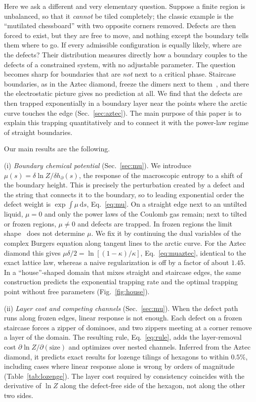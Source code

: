 \documentclass[aps,pre,twocolumn,superscriptaddress,nofootinbib,floatfix]{revtex4-2}
\newcommand{\dd}{\mathrm{d}}
\begin{document}
Here we ask a different and very elementary question. Suppose a finite region is unbalanced, so that it \emph{cannot} be tiled completely; the classic example is the ``mutilated chessboard'' with two opposite corners removed. Defects are then forced to exist, but they are free to move, and nothing except the boundary tells them where to go. If every admissible configuration is equally likely, where are the defects? Their distribution measures directly how a boundary couples to the defects of a constrained system, with no adjustable parameter. The question becomes sharp for boundaries that are \emph{not} next to a critical phase. Staircase boundaries, as in the Aztec diamond, freeze the dimers next to them~\cite{JockuschProppShor1998}, and there the electrostatic picture gives no prediction at all. We find that the defects are then trapped exponentially in a boundary layer near the points where the arctic curve touches the edge (Sec.~\ref{sec:aztec}). The main purpose of this paper is to explain this trapping quantitatively and to connect it with the power-law regime of straight boundaries.

Our main results are the following.

(i) \emph{Boundary chemical potential} (Sec.~\ref{sec:mu}). We introduce $\mu(s)=\delta\ln Z/\delta h_\partial(s)$, the response of the macroscopic entropy to a shift of the boundary height. This is precisely the perturbation created by a defect and the string that connects it to the boundary, so to leading exponential order the defect weight is $\exp\int\mu\,\dd s$, Eq.~\eqref{eq:mu}. On a straight edge next to an untilted liquid, $\mu=0$ and only the power laws of the Coulomb gas remain; next to tilted or frozen regions, $\mu\neq0$ and defects are trapped. In frozen regions the limit shape~\cite{CohnKenyonPropp2001,KenyonOkounkov2007} does not determine $\mu$. We fix it by continuing the dual variables of the complex Burgers equation along tangent lines to the arctic curve. For the Aztec diamond this gives $\mu\delta/2=\ln[(1-\kappa)/\kappa]$, Eq.~\eqref{eq:muaztec}, identical to the exact lattice law, whereas a naive regularization is off by a factor of about $1.45$. In a ``house''-shaped domain that mixes straight and staircase edges, the same construction predicts the exponential trapping rate and the optimal trapping point without free parameters (Fig.~\ref{fig:house}).

(ii) \emph{Layer cost and competing channels} (Sec.~\ref{sec:mu}). When the defect path runs along frozen edges, linear response is not enough. Each defect on a frozen staircase forces a zipper of dominoes, and two zippers meeting at a corner remove a layer of the domain. The resulting rule, Eq.~\eqref{eq:rule}, adds the layer-removal cost $\partial\ln Z/\partial(\text{size})$ and optimizes over nested channels. Inferred from the Aztec diamond, it predicts exact results for lozenge tilings of hexagons to within $0.5\%$, including cases where linear response alone is wrong by orders of magnitude (Table~\ref{tab:lozenge}). The layer cost required by consistency coincides with the derivative of $\ln Z$ along the defect-free side of the hexagon, not along the other two sides.
\end{document}
